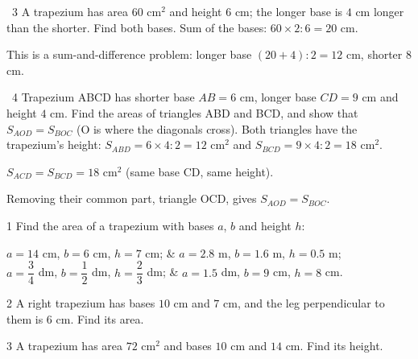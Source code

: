 \gap
\begin{exbox}{\ExWord\ 3}
A trapezium has area $60$ cm$^2$ and height $6$ cm; the longer base is $4$ cm longer than the shorter. Find both bases.
\guide
Sum of the bases: $60\times2:6=20$ cm.\par This is a sum-and-difference problem: longer base $(20+4):2=12$ cm, shorter $8$ cm.
\end{exbox}
\gap
\begin{exbox}{\ExWord\ 4}
Trapezium ABCD has shorter base $AB=6$ cm, longer base $CD=9$ cm and height $4$ cm. Find the areas of triangles ABD and BCD, and show that $S_{AOD}=S_{BOC}$ (O is where the diagonals cross).
\guide
Both triangles have the trapezium's height: $S_{ABD}=6\times4:2=12$ cm$^2$ and $S_{BCD}=9\times4:2=18$ cm$^2$.\par
$S_{ACD}=S_{BCD}=18$ cm$^2$ (same base CD, same height).\par Removing their common part, triangle OCD, gives $S_{AOD}=S_{BOC}$.
\end{exbox}
\begin{probbox}{1}{\relax}
Find the area of a trapezium with bases $a$, $b$ and height $h$:
\begin{cols2}
 $a=14$ cm, $b=6$ cm, $h=7$ cm; &  $a=2.8$ m, $b=1.6$ m, $h=0.5$ m;\\
 $a=\dfrac34$ dm, $b=\dfrac12$ dm, $h=\dfrac23$ dm; &  $a=1.5$ dm, $b=9$ cm, $h=8$ cm.
\end{cols2}
\end{probbox}
\gap
\begin{probbox}{2}{\relax}
A right trapezium has bases $10$ cm and $7$ cm, and the leg perpendicular to them is $6$ cm. Find its area.
\end{probbox}
\gap
\begin{probbox}{3}{\relax}
A trapezium has area $72$ cm$^2$ and bases $10$ cm and $14$ cm. Find its height.
\end{probbox}
